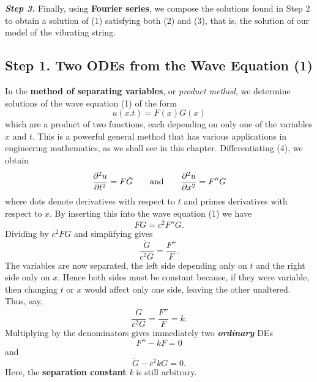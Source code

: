 \documentclass[12pt, leqno, oneside]{amsart}
\begin{document}
\emph{\textbf{Step 3.}} Finally, using \textbf{Fourier series}, we compose 
the solutions found in Step 2 to obtain a solution of (1) satisfying both 
(2) and (3), that is, the solution of our model of the vibrating string.

\subsection{Step 1. Two ODEs from the Wave Equation (1)}

In the \textbf{method of separating variables}, or \emph{product method}, we 
determine solutions of the wave equation (1) of the form
\begin{equation}
    u(x.t) = F(x)G(x)
\end{equation}
which are a product of two functions, each depending on only one of the 
variables $x$ and $t$. This is a powerful general method that has various 
applications in engineering mathematics, as we shall see in this chapter. 
Differentiating (4), we obtain
\begin{equation}
  \nonumber
    \frac{ \partial^2{u} }{ \partial{t^2} } = F\ddot{G} \qquad \text{and} \\
        \qquad \frac{ \partial^2{u} }{ \partial{x^2} } = F''G
\end{equation}
where dots denote derivatives with respect to $t$ and primes derivatives with
respect to $x$. By inserting this into the wave equation (1) we have
\begin{equation}
  \nonumber
    F\ddot{G} = c^2F''G.
\end{equation}
Dividing by $c^2FG$ and simplifying gives
\begin{equation}
  \nonumber
    \frac{\ddot{G}}{c^2G} = \frac{F''}{F}.
\end{equation}
The variables are now separated, the left side depending only on $t$ and the 
right side only on $x$. Hence both sides must be constant because, if they 
were variable, then changing $t$ or $x$ would affect only one side, leaving 
the other unaltered. Thus, say,
\begin{equation}
  \nonumber
    \frac{\ddot{G}}{c^2G} = \frac{F''}{F} = k.
\end{equation}
Multiplying by the denominators gives immediately two \emph{\textbf{ordinary}} 
DEs
\begin{equation}
    F'' - kF = 0
\end{equation}
and
\begin{equation}
    \ddot{G} - c^2kG = 0.
\end{equation}
Here, the \textbf{separation constant} \emph{k} is still arbitrary.
\end{document}
